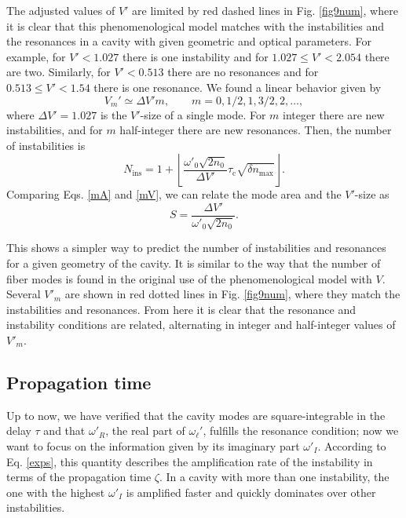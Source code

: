 \documentclass[aps,pra,reprint,amsmath,amssymb,showpacs,groupedaddress,floatfix]{revtex4-1}
\begin{document}
The adjusted values of $V'$ are limited by red dashed lines in Fig. \ref{fig9num}, where it is clear that this phenomenological model matches with the instabilities and the resonances in a cavity with given geometric and optical parameters. For example, for $V'<1.027$ there is one instability and for $1.027\leq V'< 2.054$ there are two. Similarly, for $V'< 0.513$ there are no resonances and for $0.513\leq V'< 1.54$ there is one resonance. We found a linear behavior given by
\begin{equation}
V_m'\simeq \Delta V' m, \qquad m=0,1/2,1,3/2,2,\dots,
\end{equation}
where $\Delta V'= 1.027$ is the $V'$-size of a single mode. For $m$ integer there are new instabilities, and for $m$ half-integer there are new resonances. Then, the number of instabilities is
\begin{equation}\label{mV}
N_\text{ins}= 1 + \left\lfloor \frac{\omega'_0\sqrt{2 n_0}}{\Delta V'}\tau_\text{c}\sqrt{\delta n_\text{max}}\right\rfloor.
\end{equation}
Comparing Eqs. \eqref{mA} and \eqref{mV}, we can relate the mode area and the $V'$-size as
\begin{equation}
S=\frac{\Delta V'}{\omega'_0\sqrt{2 n_0}}.
\end{equation}

This shows a simpler way to predict the number of instabilities and resonances for a given geometry of the cavity. It is similar to the way that the number of fiber modes is found in the original use of the phenomenological model with $V$. Several $V'_m$ are shown in red dotted lines in Fig. \ref{fig9num}, where they match the instabilities and resonances. From here it is clear that the resonance and instability conditions are related, alternating in integer and half-integer values of $V'_m$.

\subsection{Propagation time}
Up to now, we have verified that the cavity modes are square-integrable in the delay $\tau$ and that $\omega'_R$, the real part of $\omega_\ell'$, fulfills the resonance condition; now we want to focus on the information given by its imaginary part $\omega'_I$. According to Eq. \eqref{exps}, this quantity describes the amplification rate of the instability in terms of the propagation time $\zeta$. In a cavity with more than one instability, the one with the highest $\omega'_I$ is amplified faster and quickly dominates over other instabilities.
\end{document}

